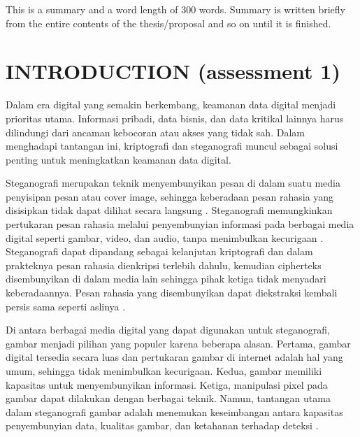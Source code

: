 \documentclass{ittelkom}
\begin{document}

{This is a summary and a word length of 300 words. Summary is written briefly from the entire contents of the thesis/proposal and so on until it is finished.}

\newpage
\section{INTRODUCTION \color{red} (assessment 1)}
Dalam era digital yang semakin berkembang, keamanan data digital menjadi
prioritas utama. Informasi pribadi, data bisnis, dan data kritikal lainnya
harus dilindungi dari ancaman kebocoran atau akses yang tidak sah. Dalam
menghadapi tantangan ini, kriptografi dan steganografi muncul sebagai solusi
penting untuk meningkatkan keamanan data digital.

Steganografi merupakan teknik menyembunyikan pesan di dalam suatu media
penyisipan pesan atau cover image, sehingga keberadaan pesan rahasia yang
disisipkan tidak dapat dilihat secara langsung \cite{pujianto2021uji}.
Steganografi memungkinkan pertukaran pesan rahasia melalui penyembunyian
informasi pada berbagai media digital seperti gambar, video, dan audio, tanpa
menimbulkan kecurigaan \cite{siaulhak2023sistem}. Steganografi dapat dipandang
sebagai kelanjutan kriptografi dan dalam prakteknya pesan rahasia dienkripsi
terlebih dahulu, kemudian cipherteks disembunyikan di dalam media lain sehingga
pihak ketiga tidak menyadari keberadaannya. Pesan rahasia yang disembunyikan
dapat diekstraksi kembali persis sama seperti aslinya
\cite{soetarmono2012studi}.

Di antara berbagai media digital yang dapat digunakan untuk steganografi,
gambar menjadi pilihan yang populer karena beberapa alasan. Pertama, gambar
digital tersedia secara luas dan pertukaran gambar di internet adalah hal yang
umum, sehingga tidak menimbulkan kecurigaan. Kedua, gambar memiliki kapasitas
untuk menyembunyikan informasi. Ketiga, manipulasi pixel pada gambar dapat
dilakukan dengan berbagai teknik. Namun, tantangan utama dalam steganografi
gambar adalah menemukan keseimbangan antara kapasitas penyembunyian data,
kualitas gambar, dan ketahanan terhadap deteksi \cite{fikri2022optimasi}.
\end{document}
